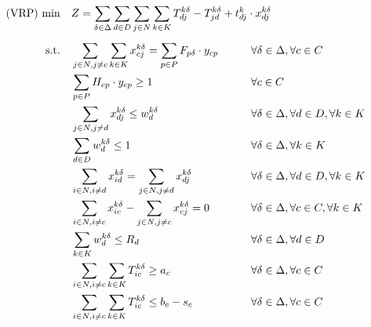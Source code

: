\documentclass[preprint,review,12pt]{elsarticle}
\begin{document}
\begin{align}
	\text{(VRP) min} \quad      & Z = \sum\limits_{\delta\in \Delta}\sum\limits_{d\in D} \sum\limits_{j\in N}\sum\limits_{k\in K} T_{dj}^{k\delta} - T_{jd}^{k\delta} + t_{dj}^k \cdot x_{dj}^{k\delta}    && \label{PCVRP_FObj}    \\[5pt]
	\noindent \text{s.t.} \quad & \sum\limits_{j \in N,j \ne c}\sum\limits_{k \in K} x_{cj}^{k\delta} = \sum\limits_{p \in P} F_{p\delta} \cdot y_{cp}    && \text{\hspace{-1cm}} \forall \delta \in \Delta, \forall c \in C \label{PCVRP_Service} \\
	& \sum\limits_{p \in P} H_{cp} \cdot y_{cp} \geq 1                 && \text{\hspace{-1cm}} \forall c \in C  \label{PCVRP_Freq} \\
	& \sum\limits_{j \in N, j \ne d}x_{dj}^{k\delta} \leq w_d^{k\delta} && \text{\hspace{-1cm}} \forall \delta \in \Delta, \forall d \in D, \forall k \in K \label{PCVRP_StartRoute} \\
	& \sum\limits_{d \in D}w_d^{k\delta} \leq 1 && \text{\hspace{-1cm}} \forall \delta \in \Delta, \forall k \in K \label{PCVRP_OneRouteK} \\
	& \sum\limits_{i \in N, i \ne d}x_{id}^{k\delta} =    \sum\limits_{j \in N, j \ne d}x_{dj}^{k\delta} && \text{\hspace{-1cm}} \forall \delta \in \Delta, \forall d \in D, \forall k \in K   \label{PCVRP_EndRoute} \\
	& \sum\limits_{i \in N, i \ne c}x_{ic}^{k\delta} - \sum\limits_{j \in N, j \ne c}x_{cj}^{k\delta} = 0             && \text{\hspace{-1cm}} \forall \delta \in \Delta, \forall c \in C, \forall k \in K  \label{PCVRP_Balance} \\
	& \sum\limits_{k \in K}w_d^{k\delta} \leq R_d && \text{\hspace{-1cm}} \forall \delta \in \Delta, \forall d \in D \label{PCVRP_CapacityD} \\
	& \sum\limits_{i \in N, i \ne c} \sum\limits_{k \in K}T_{ic}^{k\delta} \geq a_c  && \text{\hspace{-1cm}} \forall \delta \in \Delta, \forall c \in C \label{PCVRP_ArriveT}\\
	& \sum\limits_{i \in N, i \ne c} \sum\limits_{k \in K}T_{ic}^{k\delta} \leq b_c - s_c && \text{\hspace{-1cm}} \forall \delta \in \Delta, \forall c \in C \label{PCVRP_DepartT}
\end{align}
\end{document}
